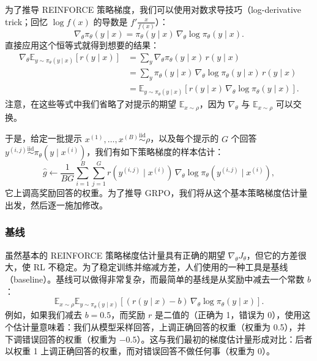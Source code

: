 为了推导 REINFORCE 策略梯度，我们可以使用对数求导技巧（log-derivative trick；回忆 $\log f(x)$ 的导数是 $f'\frac{x}{f(x)}$）：
\begin{equation}
\nabla_\theta \pi_\theta(y \mid x) = \pi_\theta(y \mid x)\, \nabla_\theta \log \pi_\theta(y \mid x).
\end{equation}
直接应用这个恒等式就得到想要的结果：
\begin{align}
\nabla_\theta \mathbb{E}_{y\sim\pi_\theta(y \mid x)}[r(y \mid x)] &= \sum_y \nabla_\theta \pi_\theta(y \mid x)\, r(y \mid x) \\
&= \sum_y \pi_\theta(y \mid x)\, \nabla_\theta \log \pi_\theta(y \mid x)\, r(y \mid x) \\
&= \mathbb{E}_{y\sim\pi_\theta(y \mid x)}[r(y \mid x)\, \nabla_\theta \log \pi_\theta(y \mid x)].
\end{align}
注意，在这些等式中我们省略了对提示的期望 $\mathbb{E}_{x\sim\rho}$，因为 $\nabla_\theta$ 与 $\mathbb{E}_{x\sim\rho}$ 可以交换。

于是，给定一批提示 $x^{(1)}, \dots, x^{(B)} \overset{\text{iid}}{\sim} \rho$，以及每个提示的 $G$ 个回答 $y^{(i,j)} \overset{\text{iid}}{\sim} \pi_\theta(y \mid x^{(i)})$，我们有如下策略梯度的样本估计：
\begin{equation}
\hat{g} \leftarrow \frac{1}{BG}\sum_{i=1}^{B}\sum_{j=1}^{G} r(y^{(i,j)} \mid x^{(i)})\, \nabla_\theta \log \pi_\theta(y^{(i,j)} \mid x^{(i)}),
\end{equation}
它上调高奖励回答的权重。为了推导 GRPO，我们将从这个基本策略梯度估计量出发，然后逐一施加修改。

\subsubsection{基线}

虽然基本的 REINFORCE 策略梯度估计量具有正确的期望 $\nabla_\theta J_\theta$，但它的方差很大，使 RL 不稳定。为了稳定训练并缩减方差，人们使用的一种工具是基线（baseline）。基线可以做得非常复杂，而最简单的基线是从奖励中减去一个常数 $b$：
\begin{equation}
\mathbb{E}_{x\sim\rho}\mathbb{E}_{y\sim\pi_\theta(y \mid x)}[(r(y \mid x) - b)\, \nabla_\theta \log \pi_\theta(y \mid x)].
\end{equation}
例如，如果我们减去 $b = 0.5$，而奖励 $r$ 是二值的（正确为 1，错误为 0），使用这个估计量意味着：我们从模型采样回答，上调正确回答的权重（权重为 0.5），并下调错误回答的权重（权重为 $-0.5$）。这与我们最初的梯度估计量形成对比：后者以权重 1 上调正确回答的权重，而对错误回答不做任何事（权重为 0）。

